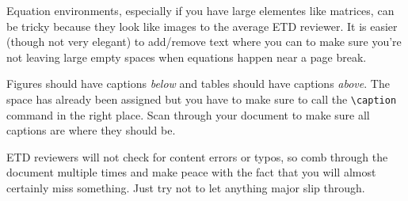 \begin{todolist}
\item Equation environments, especially if you have large elementes like matrices, can be tricky because they look like images to the average ETD reviewer. It is easier (though not very elegant) to add/remove text where you can to make sure you're not leaving large empty spaces when equations happen near a page break.
\item Figures should have captions {\em below} and tables should have captions {\em above}. The space has already been assigned but you have to make sure to call the \verb|\caption| command in the right place. Scan through your document to make sure all captions are where they should be.
\item ETD reviewers will not check for content errors or typos, so comb through the document multiple times and make peace with the fact that you will almost certainly miss something. Just try not to let anything major slip through. 
\end{todolist}


